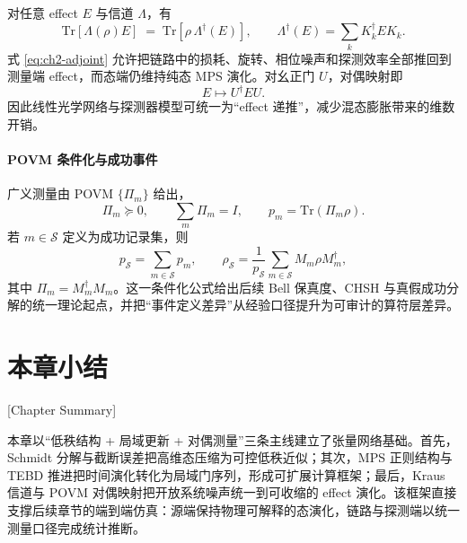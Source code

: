 对任意 effect $E$ 与信道 $\Lambda$，有
\begin{equation}
\mathrm{Tr}\!\left[\Lambda(\rho)E\right]
\;=\;
\mathrm{Tr}\!\left[\rho\,\Lambda^\dagger(E)\right],
\qquad
\Lambda^\dagger(E)=\sum_k K_k^\dagger E K_k.
\label{eq:ch2-adjoint}
\end{equation}
式 \eqref{eq:ch2-adjoint} 允许把链路中的损耗、旋转、相位噪声和探测效率全部推回到测量端 effect，而态端仍维持纯态 MPS 演化。对幺正门 $U$，对偶映射即
\begin{equation}
E\mapsto U^\dagger E U.
\end{equation}
因此线性光学网络与探测器模型可统一为“effect 递推”，减少混态膨胀带来的维数开销。

\paragraph{POVM 条件化与成功事件}

广义测量由 POVM $\{\Pi_m\}$ 给出，
\begin{equation}
\Pi_m\succeq 0,\qquad \sum_m \Pi_m=I,\qquad
p_m=\mathrm{Tr}(\Pi_m\rho).
\end{equation}
若 $m\in\mathcal{S}$ 定义为成功记录集，则
\begin{equation}
p_{\mathcal{S}}=\sum_{m\in\mathcal{S}}p_m,
\qquad
\rho_{\mathcal{S}}=
\frac{1}{p_{\mathcal{S}}}
\sum_{m\in\mathcal{S}}M_m\rho M_m^\dagger,
\end{equation}
其中 $\Pi_m=M_m^\dagger M_m$。这一条件化公式给出后续 Bell 保真度、CHSH 与真假成功分解的统一理论起点，并把“事件定义差异”从经验口径提升为可审计的算符层差异。

\section{本章小结}[Chapter Summary]

本章以“低秩结构 + 局域更新 + 对偶测量”三条主线建立了张量网络基础。首先，Schmidt 分解与截断误差把高维态压缩为可控低秩近似；其次，MPS 正则结构与 TEBD 推进把时间演化转化为局域门序列，形成可扩展计算框架；最后，Kraus 信道与 POVM 对偶映射把开放系统噪声统一到可收缩的 effect 演化。该框架直接支撑后续章节的端到端仿真：源端保持物理可解释的态演化，链路与探测端以统一测量口径完成统计推断。
